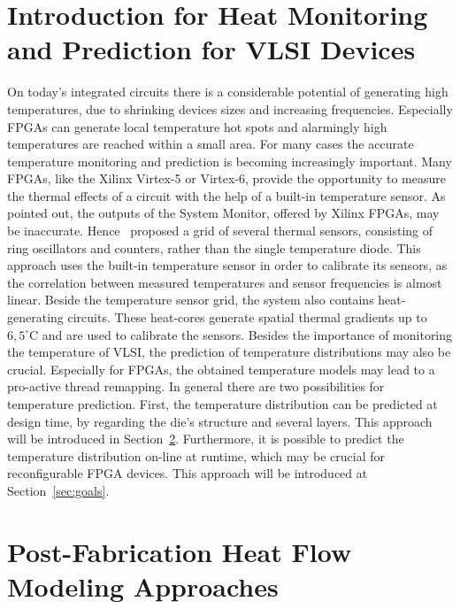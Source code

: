 \documentclass[12pt,twoside,doublepage]{article}
\begin{document}
\section{Introduction for Heat Monitoring and Prediction for VLSI Devices}
\label{sec:intro}
On today's integrated circuits there is a considerable potential of generating high temperatures, due to shrinking devices sizes and increasing frequencies. Especially FPGAs can generate local temperature hot spots and alarmingly high temperatures are reached within a small area. For many cases the accurate temperature monitoring and
prediction is becoming increasingly important.
Many FPGAs, like the Xilinx Virtex-5 or Virtex-6, provide the opportunity to measure the thermal effects of a circuit with the help of a built-in temperature sensor. As~\cite{Sayed2011} pointed out, the outputs of the System Monitor, offered by Xilinx FPGAs, may be inaccurate. Hence~\cite{Happe} proposed a grid of several thermal sensors, consisting of ring oscillators and counters, rather than the single temperature diode. This approach uses the built-in temperature sensor in order to calibrate its sensors, as the correlation between measured temperatures and sensor frequencies is almost linear. Beside the temperature sensor grid, the system also contains heat-generating circuits. These heat-cores generate spatial thermal gradients up to $6,5^\circ$C and are used to calibrate the sensors.
Besides the importance of monitoring the temperature of VLSI, the prediction of temperature distributions may also be crucial. Especially for FPGAs, the obtained temperature models may lead to a pro-active thread remapping. In general there are two possibilities for temperature prediction. First, the temperature distribution can be predicted at design time, by regarding the die's structure and several layers. This approach will be introduced in Section~\ref{sec:approach}. Furthermore, it is possible to predict the temperature distribution on-line at runtime, which may be crucial for reconfigurable FPGA devices. This approach will be introduced at Section~\ref{sec:goals}.
 
\section{Post-Fabrication Heat Flow Modeling Approaches}
\label{sec:approach}
 
\end{document}
